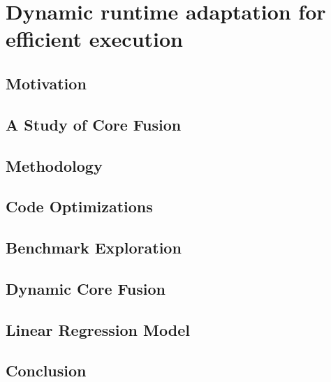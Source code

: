 \newcommand{\bm}[1]{\textit{#1}}
\setlength{\textfloatsep}{0.1cm}

\chapter{Dynamic runtime adaptation for efficient execution}




%

\section{Motivation}\label{sec:motivation}


\section{A Study of Core Fusion}\label{sec:lim_study}


\section{Methodology}\label{sec:setup}


\section{Code Optimizations}\label{sec:opt}


\section{Benchmark Exploration}\label{sec:expl}


\section{Dynamic Core Fusion}\label{sec:dynamic}



\section{Linear Regression Model}\label{sec:model}


%

\section{Conclusion}\label{sec:conc}
